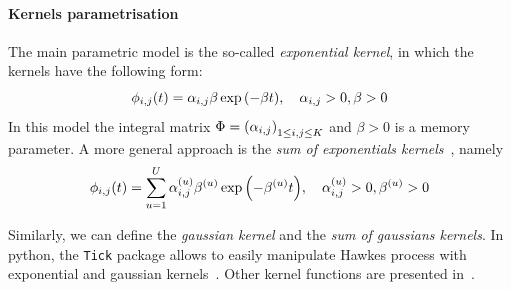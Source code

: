 \paragraph{Kernels parametrisation}
The main parametric model is the so-called \textit{exponential kernel}, in which the kernels have the following form:
\begin{equation}
    \phi_{i,j}(t) = \alpha_{i,j} \beta \exp{\left( -\beta t \right)}, \quad \alpha_{i,j} > 0, \beta > 0
\end{equation}
In this model the integral matrix $\Phi = \left( \alpha_{i,j} \right)_{1\leq i,j\leq K}$ and $\beta > 0$ is a memory parameter.
A more general approach is the \textit{sum of exponentials kernels}~\citep{lemonnier2014nonparametric}, namely
\begin{equation}
    \phi_{i,j}(t) = \sum_{u=1}^U \alpha_{i,j}^{(u)} \beta^{(u)} \exp{\left( -\beta^{(u)} t \right)}, \quad \alpha_{i,j}^{(u)} > 0, \beta^{(u)} > 0
\end{equation}

Similarly, we can define the \textit{gaussian kernel} and the \textit{sum of gaussians kernels}.
In python, the \texttt{Tick} package allows to easily manipulate Hawkes process with exponential and gaussian kernels~\citep{bompaire2019machine, bacry2017tick}.
Other kernel functions are presented in~\citep{mehrdad2014hawkes}.
